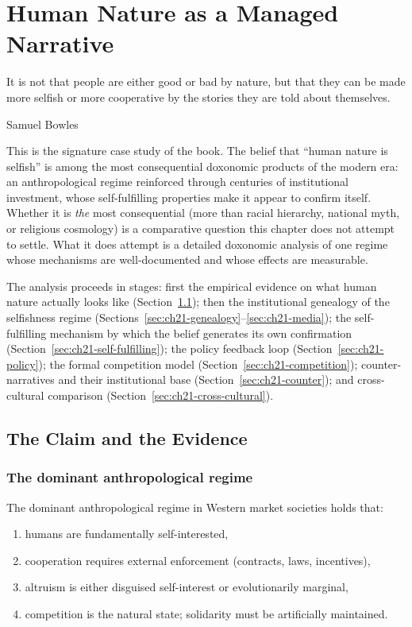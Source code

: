 \chapter{Human Nature as a Managed Narrative}
\label{ch:human-nature}

\epigraph{It is not that people are either good or bad by nature, but that they can be made more selfish or more cooperative by the stories they are told about themselves.}{Samuel Bowles}

\noindent
This is the signature case study of the book.
The belief that ``human nature is selfish'' is among the most consequential doxonomic products of the modern era: an anthropological regime reinforced through centuries of institutional investment, whose self-fulfilling properties make it appear to confirm itself.
Whether it is \emph{the} most consequential (more than racial hierarchy, national myth, or religious cosmology) is a comparative question this chapter does not attempt to settle.
What it does attempt is a detailed doxonomic analysis of one regime whose mechanisms are well-documented and whose effects are measurable.

The analysis proceeds in stages: first the empirical evidence on what human nature actually looks like (Section~\ref{sec:ch21-evidence}); then the institutional genealogy of the selfishness regime (Sections~\ref{sec:ch21-genealogy}--\ref{sec:ch21-media}); the self-fulfilling mechanism by which the belief generates its own confirmation (Section~\ref{sec:ch21-self-fulfilling}); the policy feedback loop (Section~\ref{sec:ch21-policy}); the formal competition model (Section~\ref{sec:ch21-competition}); counter-narratives and their institutional base (Section~\ref{sec:ch21-counter}); and cross-cultural comparison (Section~\ref{sec:ch21-cross-cultural}).

\section{The Claim and the Evidence}
\label{sec:ch21-evidence}

\subsection{The dominant anthropological regime}

The dominant anthropological regime in Western market societies holds that:
\begin{enumerate}[nosep]
  \item humans are fundamentally self-interested,
  \item cooperation requires external enforcement (contracts, laws, incentives),
  \item altruism is either disguised self-interest or evolutionarily marginal,
  \item competition is the natural state; solidarity must be artificially maintained.
\end{enumerate}

